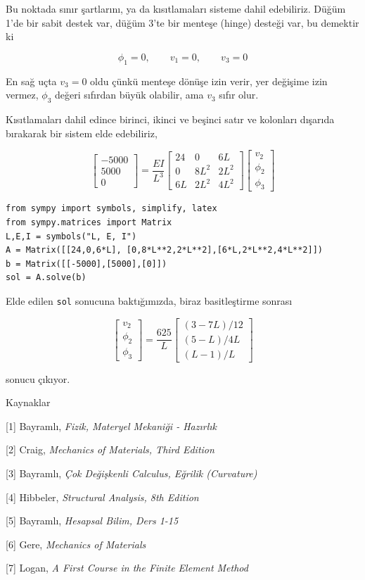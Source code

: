 \documentclass[12pt,fleqn]{article}\usepackage{../../common}
\begin{document}
Bu noktada sınır şartlarını, ya da kısıtlamaları sisteme dahil edebiliriz.
Düğüm 1'de bir sabit destek var, düğüm 3'te bir menteşe (hinge) desteği var,
bu demektir ki

$$
\phi_1 = 0, \qquad
v_1 = 0, \qquad
v_3 = 0
$$

En sağ uçta $v_3 = 0$ oldu çünkü menteşe dönüşe izin verir, yer değişime
izin vermez, $\phi_3$ değeri sıfırdan büyük olabilir, ama $v_3$ sıfır olur.

Kısıtlamaları dahil edince birinci, ikinci ve beşinci satır ve kolonları
dışarıda bırakarak bir sistem elde edebiliriz,

$$
\left[\begin{array}{c}
-5000 \\ 5000 \\ 0
\end{array}\right] =
\frac{EI}{L^3}
\left[\begin{array}{ccc}
24 & 0 & 6L \\
0 & 8L^2 & 2L^2 \\
6L & 2L^2 & 4L^2
\end{array}\right]
\left[\begin{array}{c}
v_2 \\ \phi_2 \\ \phi_3
\end{array}\right]
$$

\begin{verbatim}
from sympy import symbols, simplify, latex
from sympy.matrices import Matrix
L,E,I = symbols("L, E, I")
A = Matrix([[24,0,6*L], [0,8*L**2,2*L**2],[6*L,2*L**2,4*L**2]])
b = Matrix([[-5000],[5000],[0]])
sol = A.solve(b)
\end{verbatim}

Elde edilen \verb!sol! sonucuna baktığımızda, biraz basitleştirme sonrası

$$
\left[\begin{array}{c}
v_2 \\ \phi_2 \\ \phi_3
\end{array}\right] =
\frac{625}{L}
\left[\begin{array}{c}
(3-7L)/12 \\
(5-L)/4L \\
(L-1)/L
\end{array}\right]
$$

sonucu çıkıyor.

Kaynaklar

[1] Bayramlı, {\em Fizik, Materyel Mekaniği - Hazırlık}

[2] Craig, {\em Mechanics of Materials, Third Edition}

[3] Bayramlı, {\em Çok Değişkenli Calculus, Eğrilik (Curvature)}

[4] Hibbeler, {\em Structural Analysis, 8th Edition}

[5] Bayramlı, {\em Hesapsal Bilim, Ders 1-15}

[6] Gere, {\em Mechanics of Materials}

[7] Logan, {\em A First Course in the Finite Element Method}
\end{document}
